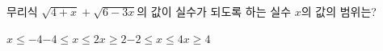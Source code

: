 \hspace*{2mm}\begin{minipage}[t]{\dimexpr\linewidth-2mm\relax}\vspace{0pt}
무리식 $\sqrt{4+x}+\sqrt{6-3x}$의 값이 실수가 되도록 하는 실수 $x$의 값의 범위는?
\begin{choices32}{$x\le -4$}{$-4\le x\le 2$}{$x\ge 2$}{$-2\le x\le 4$}{$x\ge 4$}\end{choices32}\end{minipage}
